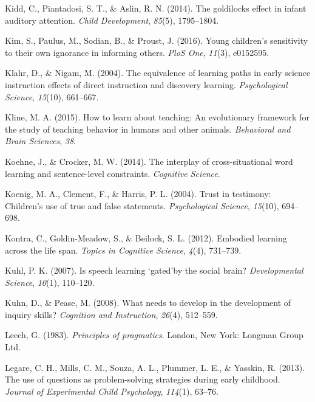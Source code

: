 \documentclass[oneside]{report}
\begin{document}
\hypertarget{ref-kidd2014goldilocks}{}
Kidd, C., Piantadosi, S. T., \& Aslin, R. N. (2014). The goldilocks
effect in infant auditory attention. \emph{Child Development},
\emph{85}(5), 1795--1804.

\hypertarget{ref-kim2016young}{}
Kim, S., Paulus, M., Sodian, B., \& Proust, J. (2016). Young children's
sensitivity to their own ignorance in informing others. \emph{PloS One},
\emph{11}(3), e0152595.

\hypertarget{ref-klahr2004equivalence}{}
Klahr, D., \& Nigam, M. (2004). The equivalence of learning paths in
early science instruction effects of direct instruction and discovery
learning. \emph{Psychological Science}, \emph{15}(10), 661--667.

\hypertarget{ref-kline2015learn}{}
Kline, M. A. (2015). How to learn about teaching: An evolutionary
framework for the study of teaching behavior in humans and other
animals. \emph{Behavioral and Brain Sciences}, \emph{38}.

\hypertarget{ref-koehne2014interplay}{}
Koehne, J., \& Crocker, M. W. (2014). The interplay of cross-situational
word learning and sentence-level constraints. \emph{Cognitive Science}.

\hypertarget{ref-koenig2004trust}{}
Koenig, M. A., Clement, F., \& Harris, P. L. (2004). Trust in testimony:
Children's use of true and false statements. \emph{Psychological
Science}, \emph{15}(10), 694--698.

\hypertarget{ref-kontra2012embodied}{}
Kontra, C., Goldin-Meadow, S., \& Beilock, S. L. (2012). Embodied
learning across the life span. \emph{Topics in Cognitive Science},
\emph{4}(4), 731--739.

\hypertarget{ref-kuhl2007speech}{}
Kuhl, P. K. (2007). Is speech learning `gated'by the social brain?
\emph{Developmental Science}, \emph{10}(1), 110--120.

\hypertarget{ref-kuhn2008needs}{}
Kuhn, D., \& Pease, M. (2008). What needs to develop in the development
of inquiry skills? \emph{Cognition and Instruction}, \emph{26}(4),
512--559.

\hypertarget{ref-leech1983}{}
Leech, G. (1983). \emph{Principles of pragmatics}. London, New York:
Longman Group Ltd.

\hypertarget{ref-legare2013use}{}
Legare, C. H., Mills, C. M., Souza, A. L., Plummer, L. E., \& Yasskin,
R. (2013). The use of questions as problem-solving strategies during
early childhood. \emph{Journal of Experimental Child Psychology},
\emph{114}(1), 63--76.
\end{document}
